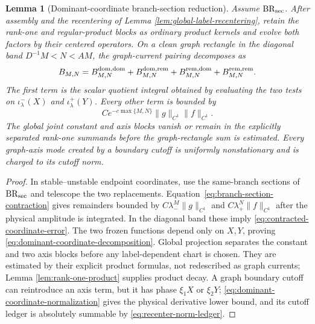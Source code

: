 \documentclass[11pt]{article}
\newtheorem{lemma}[theorem]{Lemma}
\begin{document}
\begin{lemma}[Dominant-coordinate branch-section reduction]
\label{lem:dominant-coordinate-reduction}
Assume $\mathrm{BR}_{\rm sec}$.  After assembly and the recentering of Lemma
\ref{lem:global-label-recentering}, retain the rank-one and regular-product
blocks as ordinary product kernels and evolve both factors by their centered
operators.
On a clean graph rectangle in the diagonal band
$D^{-1}M<N<AM$, the graph-current pairing decomposes as
\begin{equation}
\label{eq:dominant-coordinate-decomposition}
 B_{M,N}=B^{\rm dom,dom}_{M,N}
 +B^{\rm dom,rem}_{M,N}+B^{\rm rem,dom}_{M,N}
 +B^{\rm rem,rem}_{M,N}.
\end{equation}
The first term is the scalar quotient integral obtained by evaluating the two
tests on $\iota^-_\lambda(X)$ and $\iota^+_\lambda(Y)$.
Every other term is bounded by
\begin{equation}
\label{eq:contracted-coordinate-error}
 Ce^{-c\max\{M,N\}}\|g\|_{C^1}\|f\|_{C^1}.
\end{equation}
The global joint constant and axis blocks vanish or remain in the explicitly
separated rank-one summands before the graph-rectangle sum is estimated.
Every graph-axis mode created by a boundary cutoff is uniformly
nonstationary and is charged to its cutoff norm.
\end{lemma}

\begin{proof}
In stable--unstable endpoint coordinates, use the same-branch sections of
$\mathrm{BR}_{\rm sec}$ and telescope the two replacements.
Equation~\eqref{eq:branch-section-contraction} gives remainders bounded by
$C\lambda_-^M\|g\|_{C^1}$ and $C\lambda_+^N\|f\|_{C^1}$ after the physical
amplitude is integrated.  In the diagonal band these imply
\eqref{eq:contracted-coordinate-error}.  The two frozen functions depend
only on $X,Y$, proving \eqref{eq:dominant-coordinate-decomposition}.  Global
projection separates the constant and two axis blocks before any
label-dependent chart is chosen.  They are estimated by their explicit
product formulas, not redescribed as graph currents; Lemma
\ref{lem:rank-one-product} supplies product decay.  A graph boundary
cutoff can reintroduce an axis term, but it has phase $\xi_1X$ or $\xi_2Y$;
\eqref{eq:dominant-coordinate-normalization} gives the physical derivative
lower bound, and its cutoff ledger is absolutely summable by
\eqref{eq:recenter-norm-ledger}.
\end{proof}
\end{document}
